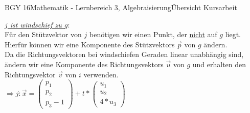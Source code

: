 \documentclass[oneside,openany,headings=optiontotoc,11pt,numbers=noenddot]{scrreprt}
\begin{document}
\begin{worksheet}{BGY 16}{Mathematik - Lernbereich 3, Algebraisierung}{Übersicht Kursarbeit}
\begin{framed}
			\par\bigskip\noindent
			\underline{\textit{\(j\) ist \color{red}windschief\normalcolor{} zu \(g\)}}:\\
			Für den Stützvektor von \(j\) benötigen wir einen Punkt, der \underline{nicht} auf \(g\) liegt. Hierfür können wir eine Komponente des Stützvektors \(\vec{p}\) von \(g\) ändern.\\ Da die Richtungsvektoren bei \color{red}windschiefen\normalcolor{} Geraden linear \color{blue}unabhängig\normalcolor{} sind, ändern wir eine Komponente des Richtungsvektors \(\vec{u}\) von \(g\) und erhalten den Richtungsvektor \(\vec{v}\) von \(i\) verwenden.\\
			\(\Rightarrow j: \vec{x} = \left(\begin{array}{c}p_1\\p_2\\p_3-1\end{array}\right) + t*\left(\begin{array}{c}u_1\\u_2\\4*u_3\end{array}\right)\)\\
		\end{framed}
	\end{worksheet}
\end{document}
